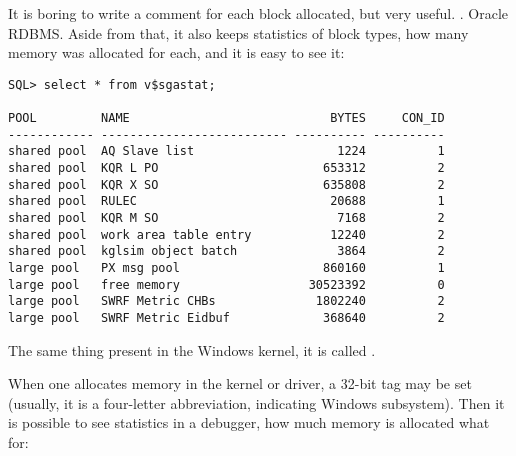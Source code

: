{It is boring to write a comment for each block allocated, but very useful}.
.
 Oracle RDBMS.
{Aside from that, it also keeps statistics of block types,
how many memory was allocated for each, and it is easy to see it}:

\begin{lstlisting}
SQL> select * from v$sgastat;

POOL         NAME                            BYTES     CON_ID
------------ -------------------------- ---------- ----------
shared pool  AQ Slave list                    1224          1
shared pool  KQR L PO                       653312          2
shared pool  KQR X SO                       635808          2
shared pool  RULEC                           20688          1
shared pool  KQR M SO                         7168          2
shared pool  work area table entry           12240          2
shared pool  kglsim object batch              3864          2
large pool   PX msg pool                    860160          1
large pool   free memory                  30523392          0
large pool   SWRF Metric CHBs              1802240          2
large pool   SWRF Metric Eidbuf             368640          2
\end{lstlisting}

{The same thing present in the Windows kernel, it is called} .

{When one allocates memory in the kernel or driver, a 32-bit tag may be set (usually, it is a four-letter
abbreviation, indicating Windows subsystem)}.
{Then it is possible to see statistics in a debugger, how much memory is allocated what for}:

